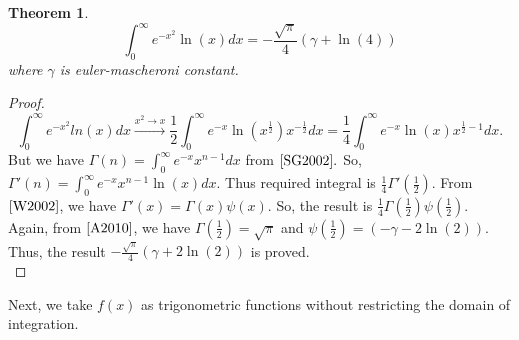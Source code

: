\documentclass[a4paper,twoside,10pt]{article}
\newtheorem{theorem}{Theorem}[section]
\begin{document}
 \begin{theorem}
\begin{equation}
 \int_0^{\infty} e^{-x^2} \ln(x) dx = -\frac{\sqrt{\pi}}{4} \left(\gamma + \ln(4)\right)    
\end{equation}
where   $\gamma  $ is euler-mascheroni constant.
\end{theorem}
\begin{proof}
 \[ \int_0^{\infty} e^{-x^2} ln(x) dx \xrightarrow{x^2 \rightarrow x} \frac{1}{2}\int_0^{\infty} e^{-x} \ln(x^{\frac{1}{2}}) x^{-\frac{1}{2}} dx =  \frac{1}{4}\int_0^{\infty} e^{-x} \ln(x) x^{\frac{1}{2}-1} dx . \]
 But we have   $ \Gamma(n) = \int_0^{\infty} e^{-x}x^{n-1} dx  $ from   $\cite{SG2002}.  $ So,   $ \Gamma'(n) = \int_0^{\infty} e^{-x} x^{n-1} \ln(x) dx .  $ Thus required integral is   $\frac{1}{4} \Gamma'(\frac{1}{2})  $. From   $\cite{W2002}  $, we have   $\Gamma'(x)=\Gamma(x)\psi(x)  $. So, the result is   $\frac{1}{4} \Gamma(\frac{1}{2}) \psi(\frac{1}{2})  $. Again, from   $\cite{A2010}  $, we have   $\Gamma(\frac{1}{2})=\sqrt{\pi}  $ and   $\psi(\frac{1}{2})=(-\gamma-2\ln(2)).  $ Thus, the result   $-\frac{\sqrt{\pi}}{4}(\gamma+2\ln(2))$ is proved.    \\
\end{proof}

 Next, we take $f(x)$ as trigonometric functions without restricting the domain of integration. 
 
\end{document}
